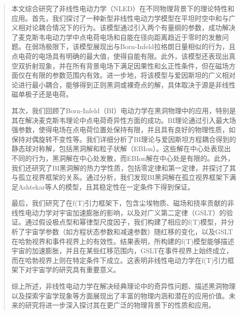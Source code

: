 \documentclass[aps,prl,preprint,groupedaddress]{revtex4-2}
\begin{document}
\begin{abstract}

本文综合研究了非线性电动力学（NLED）在不同物理背景下的理论特性和应用。首先，我们探讨了一种新型非线性电动力学模型在平坦时空中和与广义相对论耦合情况下的行为\cite{kar2024aspects}。该模型通过引入两个有量纲的参数，成功解决了麦克斯韦电动力学中点电荷电场和自能在径向距离趋近于零时的发散问题。在弱场极限下，该模型展现出与Born-Infeld拉格朗日量相似的行为，且点电荷的电场具有明确的最大值，使得自能有限。此外，该模型还表现出真空双折射现象，并在所有背景电场下满足因果性和幺正性条件，但在磁场方面仅在有限的参数范围内有效。进一步地，将该模型与爱因斯坦的广义相对论进行最小耦合，能够得到正则黑洞或裸奇点的解，具体取决于源是非线性磁单极子还是电荷。

其次，我们回顾了Born-Infeld（BI）电动力学在黑洞物理中的应用，特别是其在解决麦克斯韦理论中点电荷奇异性方面的成功\cite{breton2007nonlinear}。BI理论通过引入最大场强参数，使得电场在点电荷位置处保持有限，并且具有良好的物理性质，如保持对偶旋转不变性等。我们详细分析了BI理论与爱因斯坦方程耦合得到的静态球对称解，包括黑洞解和粒子状解（EBIon）。这些解在中心处表现出不同的行为，黑洞解在中心处发散，而EBIon解在中心处是有限的。此外，我们还研究了BI黑洞解的热力学性质，包括零定律和第一定律，并探讨了其与孤立视界框架的关系。通过分析，我们发现BI黑洞解在孤立视界框架下满足Ashtekar等人的模型，且其稳定性在一定条件下得到保证。

最后，我们研究了在f(T)引力框架下，包含尘埃物质、磁场和挠率贡献的非线性电动力学对宇宙加速膨胀的影响，以及对广义第二定律（GSLT）的验证\cite{sharif2013nonlinear}。通过假设极点型和幂律型尺度因子，我们构建了相应的f(T)模型，并分析了宇宙学参数（如方程状态参数和减速参数）随红移的变化，以及GSLT在哈勃视界和事件视界上的有效性。结果表明，所构建的f(T)模型能够描述宇宙的加速膨胀，并且在某些红移范围内，GSLT在事件视界上始终成立，而在哈勃视界上则在特定条件下成立。这表明非线性电动力学在f(T)引力框架下对宇宙学的研究具有重要意义。

综上所述，非线性电动力学在解决经典理论中的奇异性问题、描述黑洞物理以及探索宇宙学现象等方面展现出了丰富的物理内涵和潜在的应用价值。未来的研究将进一步深入探讨其在更广泛的物理背景下的性质和应用。

\end{abstract}


\maketitle
\end{document}
